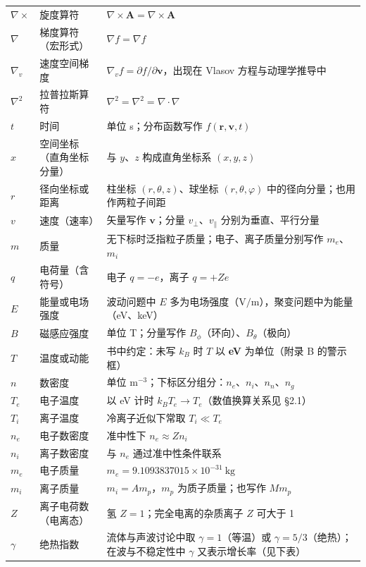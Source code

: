 \documentclass[12pt,a4paper,openany,oneside]{book}
\newcommand{\vect}[1]{\bm{#1}}
\newcommand{\grad}{\nabla}
\newcommand{\curl}{\nabla\times}
\newcommand{\divg}{\nabla\cdot}
\newcommand{\lap}{\nabla^2}
\begin{document}
{\begin{longtable}{@{}p{1.7cm}p{4.2cm}p{8.7cm}@{}}
$\curl$ & 旋度算符 & $\curl\vect{A} = \nabla\times\vect{A}$ \\
$\grad$ & 梯度算符（宏形式） & $\grad f = \nabla f$ \\
$\grad_v$ & 速度空间梯度 & $\grad_v f = \partial f/\partial\vect{v}$，出现在 Vlasov 方程与动理学推导中 \\
$\lap$ & 拉普拉斯算符 & $\lap = \nabla^2 = \divg\grad$ \\
$t$ & 时间 & 单位 s；分布函数写作 $f(\vect{r},\vect{v},t)$ \\
$x$ & 空间坐标（直角坐标分量） & 与 $y$、$z$ 构成直角坐标系 $(x,y,z)$ \\
$r$ & 径向坐标或距离 & 柱坐标 $(r,\theta,z)$、球坐标 $(r,\theta,\varphi)$ 中的径向分量；也用作两粒子间距 \\
$v$ & 速度（速率） & 矢量写作 $\vect{v}$；分量 $v_\perp$、$v_\parallel$ 分别为垂直、平行分量 \\
$m$ & 质量 & 无下标时泛指粒子质量；电子、离子质量分别写作 $m_e$、$m_i$ \\
$q$ & 电荷量（含符号） & 电子 $q = -e$，离子 $q = +Ze$ \\
$E$ & 能量或电场强度 & 波动问题中 $E$ 多为电场强度（$\mathrm{V/m}$），聚变问题中为能量（eV、keV） \\
$B$ & 磁感应强度 & 单位 T；分量写作 $B_\phi$（环向）、$B_\theta$（极向） \\
$T$ & 温度或动能 & 书中约定：未写 $k_{B}$ 时 $T$ 以 \textbf{eV} 为单位（附录 B 的警示框） \\
$n$ & 数密度 & 单位 $\mathrm{m^{-3}}$；下标区分组分：$n_e$、$n_i$、$n_n$、$n_g$ \\
$T_e$ & 电子温度 & 以 eV 计时 $k_{B}T_e \to T_e$（数值换算关系见 \S 2.1） \\
$T_i$ & 离子温度 & 冷离子近似下常取 $T_i \ll T_e$ \\
$n_e$ & 电子数密度 & 准中性下 $n_e \approx Z n_i$ \\
$n_i$ & 离子数密度 & 与 $n_e$ 通过准中性条件联系 \\
$m_e$ & 电子质量 & $m_e = 9.1093837015\times10^{-31}\ \mathrm{kg}$ \\
$m_i$ & 离子质量 & $m_i = A m_p$，$m_p$ 为质子质量；也写作 $M m_p$ \\
$Z$ & 离子电荷数（电离态） & 氢 $Z=1$；完全电离的杂质离子 $Z$ 可大于 1 \\
$\gamma$ & 绝热指数 & 流体与声波讨论中取 $\gamma = 1$（等温）或 $\gamma = 5/3$（绝热）；在波与不稳定性中 $\gamma$ 又表示增长率（见下表） \\
\end{longtable}
}
\end{document}
